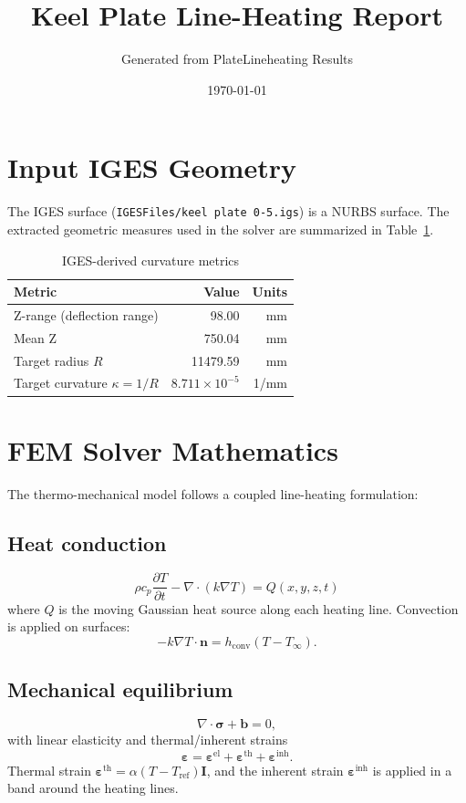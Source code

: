 \documentclass[11pt]{article}
\title{Keel Plate Line-Heating Report}
\author{Generated from PlateLineheating Results}
\date{\today}
\begin{document}
\maketitle

\section{Input IGES Geometry}
The IGES surface (\texttt{IGESFiles/keel plate 0-5.igs}) is a NURBS surface.
The extracted geometric measures used in the solver are summarized in Table~\ref{tab:iges}.

\begin{table}[h!]
\centering
\caption{IGES-derived curvature metrics}
\label{tab:iges}
\begin{tabular}{lrr}
\toprule
Metric & Value & Units \\
\midrule
Z-range (deflection range) & 98.00 & mm \\
Mean Z & 750.04 & mm \\
Target radius $R$ & 11479.59 & mm \\
Target curvature $\kappa=1/R$ & $8.711\times10^{-5}$ & 1/mm \\
\bottomrule
\end{tabular}
\end{table}

\section{FEM Solver Mathematics}
The thermo-mechanical model follows a coupled line-heating formulation:

\subsection*{Heat conduction}
\begin{equation}
\rho c_p \frac{\partial T}{\partial t} - \nabla \cdot (k \nabla T) = Q(x,y,z,t)
\end{equation}
where $Q$ is the moving Gaussian heat source along each heating line. Convection is applied on surfaces:
\begin{equation}
-k\nabla T \cdot \mathbf{n} = h_{\mathrm{conv}}(T - T_{\infty}).
\end{equation}

\subsection*{Mechanical equilibrium}
\begin{equation}
\nabla \cdot \boldsymbol{\sigma} + \mathbf{b} = 0,
\end{equation}
with linear elasticity and thermal/inherent strains
\begin{equation}
\boldsymbol{\varepsilon} = \boldsymbol{\varepsilon}^{\mathrm{el}} + \boldsymbol{\varepsilon}^{\mathrm{th}} + \boldsymbol{\varepsilon}^{\mathrm{inh}}.
\end{equation}
Thermal strain $\boldsymbol{\varepsilon}^{\mathrm{th}} = \alpha (T - T_{\mathrm{ref}})\mathbf{I}$,
and the inherent strain $\boldsymbol{\varepsilon}^{\mathrm{inh}}$ is applied in a band around the heating lines.
\end{document}
